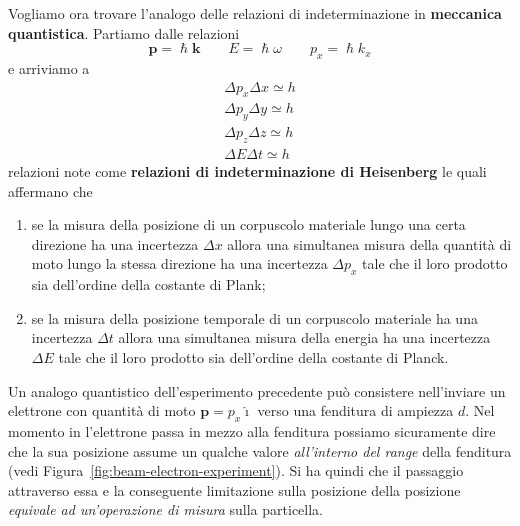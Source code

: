 Vogliamo ora trovare l'analogo delle relazioni di indeterminazione in
\textbf{meccanica quantistica}.
Partiamo dalle relazioni \[
                             \bm{p} = \hslash \bm{k} \qquad E = \hslash \omega \qquad p_{x} = \hslash k_{x}
\] e arriviamo a
\begin{gather}
    \Delta p_{x} \Delta x \simeq h\\
    \Delta p_{y} \Delta y \simeq h\\
    \Delta p_{z} \Delta z \simeq h\\
    \Delta E \Delta t \simeq h
\end{gather}
relazioni note come \textbf{relazioni di indeterminazione di
Heisenberg} le quali affermano che
\begin{enumerate}
    \tightlist
    \item
    se la misura della posizione di un corpuscolo materiale lungo una
    certa direzione ha una incertezza \(\Delta x\) allora una simultanea
    misura della quantità di moto lungo la stessa direzione ha una
    incertezza \(\Delta p_x\) tale che il loro prodotto sia dell'ordine
    della costante di Plank;
    \item
    se la misura della posizione temporale di un corpuscolo materiale ha
    una incertezza \(\Delta t\) allora una simultanea misura della energia
    ha una incertezza \(\Delta E\) tale che il loro prodotto sia
    dell'ordine della costante di Planck.
\end{enumerate}

Un analogo quantistico dell'esperimento precedente può consistere
nell'inviare un elettrone con quantità di moto
\(\bm{p} = p_{x} \hat{\imath}\) verso una fenditura di ampiezza \(d\).
Nel
momento in l'elettrone passa in mezzo alla fenditura possiamo
sicuramente dire che la sua posizione assume un qualche valore
\emph{all'interno del range} della fenditura (vedi Figura~\ref{fig:beam-electron-experiment}).
Si ha quindi che il passaggio attraverso essa e la conseguente limitazione sulla posizione
della posizione \emph{equivale ad un'operazione di misura} sulla
particella.

